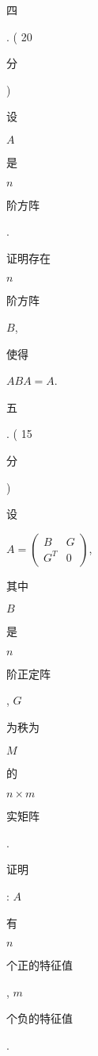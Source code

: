 \documentclass[10pt]{article}
\begin{document}
\begin{CJK}{UTF8}{mj}四\end{CJK}. ( 20 \begin{CJK}{UTF8}{mj}分\end{CJK}) \begin{CJK}{UTF8}{mj}设\end{CJK} $A$ \begin{CJK}{UTF8}{mj}是\end{CJK} $n$ \begin{CJK}{UTF8}{mj}阶方阵\end{CJK}. \begin{CJK}{UTF8}{mj}证明存在\end{CJK} $n$ \begin{CJK}{UTF8}{mj}阶方阵\end{CJK} $B$, \begin{CJK}{UTF8}{mj}使得\end{CJK} $A B A=A$. \begin{CJK}{UTF8}{mj}五\end{CJK}. ( 15 \begin{CJK}{UTF8}{mj}分\end{CJK}) \begin{CJK}{UTF8}{mj}设\end{CJK} $A=\left(\begin{array}{cc}B & G \\ G^{T} & 0\end{array}\right)$, \begin{CJK}{UTF8}{mj}其中\end{CJK} $B$ \begin{CJK}{UTF8}{mj}是\end{CJK} $n$ \begin{CJK}{UTF8}{mj}阶正定阵\end{CJK}, $G$ \begin{CJK}{UTF8}{mj}为秩为\end{CJK} $M$ \begin{CJK}{UTF8}{mj}的\end{CJK} $n \times m$ \begin{CJK}{UTF8}{mj}实矩阵\end{CJK}.

\begin{CJK}{UTF8}{mj}证明\end{CJK}: $A$ \begin{CJK}{UTF8}{mj}有\end{CJK} $n$ \begin{CJK}{UTF8}{mj}个正的特征值\end{CJK}, $m$ \begin{CJK}{UTF8}{mj}个负的特征值\end{CJK}.
\end{document}
